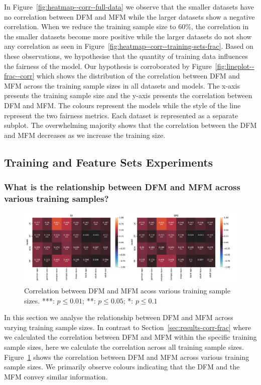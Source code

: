 \documentclass{article}
\begin{document}
In Figure \ref{fig:heatmap--corr--full-data} we observe that the
smaller datasets have no correlation between DFM and MFM while the
larger datasets show a negative correlation. When we reduce the
training sample size to 60\%, the correlation in the smaller datasets
become more positive while the larger datasets do not show any
correlation as seen in
Figure \ref{fig:heatmap--corr--training-sets-frac}. Based on these
observations, we hypothesise that the quantity of training data
influences the fairness of the model. Our hypothesis is corroborated
by Figure \ref{fig:lineplot--frac--corr} which shows the distribution
of the correlation between DFM and MFM across the training sample
sizes in all datasets and models. The x-axis presents the training
sample size and the y-axis presents the correlation between DFM and
MFM. The colours represent the models while the style of the line
represent the two fairness metrics. Each dataset is represented as
a separate subplot. The overwhelming majority shows that the
correlation between the DFM and MFM decreases as we increase the
training size.

\subsection{Training and Feature Sets
  Experiments}\label{sec:results-training-feature-sets}
\subsubsection{What is the relationship between DFM and MFM across
  various training samples?}\label{sec:results-training-sets}

\begin{figure}
  \centering
  \includegraphics[width=0.95\linewidth]{heatmap--corr--frac.pdf}
  \caption{Correlation between DFM and MFM acoss various training
  sample sizes. ***: $p\le0.01$; **: $p\le0.05$; *: $p\le0.1$}
  \label{fig:heatmap--corr--frac}
\end{figure}

In this section we analyse the relationship between DFM and MFM across
varying training sample sizes. In contrast to
Section \ref{sec:results-corr-frac} where we calculated the
correlation between DFM and MFM within the specific training sample
sizes, here we calculate the correlation across all training sample
sizes. Figure \ref{fig:heatmap--corr--frac} shows the correlation
between DFM and MFM across various training sample sizes. We primarily
observe colours indicating that the DFM and the MFM convey similar
information.
\end{document}
